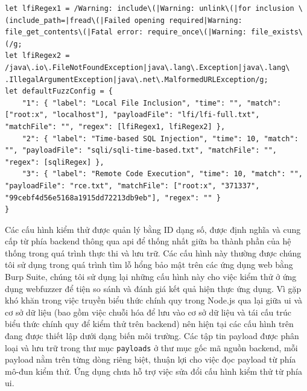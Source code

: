 \begin{lstlisting}[style=ES6, label={lst:default-fuzz-config}, caption={Cấu hình kiểm thử mặc định}]
let lfiRegex1 = /Warning: include\(|Warning: unlink\(|for inclusion \(include_path=|fread\(|Failed opening required|Warning: file_get_contents\(|Fatal error: require_once\(|Warning: file_exists\(/g;
let lfiRegex2 = /java\.io\.FileNotFoundException|java\.lang\.Exception|java\.lang\ .IllegalArgumentException|java\.net\.MalformedURLException/g;
let defaultFuzzConfig = {
    "1": { "label": "Local File Inclusion", "time": "", "match": ["root:x", "localhost"], "payloadFile": "lfi/lfi-full.txt", "matchFile": "", "regex": [lfiRegex1, lfiRegex2] },
    "2": { "label": "Time-based SQL Injection", "time": 10, "match": "", "payloadFile": "sqli/sqli-time-based.txt", "matchFile": "", "regex": [sqliRegex] },
    "3": { "label": "Remote Code Execution", "time": 10, "match": "", "payloadFile": "rce.txt", "matchFile": ["root:x", "371337", "99cebf4d56e5168a1915dd72213db9eb"], "regex": "" }
}
\end{lstlisting}
Các cấu hình kiểm thử được quản lý bằng ID dạng số, được định nghĩa và cung cấp từ phía backend thông qua \acrshort{api} để thống nhất giữa ba thành phần của hệ thống trong quá trình thực thi và lưu trữ. Các cấu hình này thường được chúng tôi sử dụng trong quá trình tìm lỗ hổng bảo mật trên các ứng dụng web bằng Burp Suite, chúng tôi sử dụng lại những cấu hình này cho việc kiểm thử ở ứng dụng webfuzzer để tiện so sánh và đánh giá kết quả hiện thực ứng dụng. Vì gặp khó khăn trong việc truyền biểu thức chính quy trong Node.js qua lại giữa \acrshort{ui} và cơ sở dữ liệu (bao gồm việc chuỗi hóa để lưu vào cơ sở dữ liệu và tái cấu trúc biểu thức chính quy để kiểm thử trên backend) nên hiện tại các cấu hình trên đang được thiết lập dưới dạng biến môi trường. Các tập tin payload được phân loại và lưu trữ trong thư mục \texttt{payloads} ở thư mục gốc mã nguồn backend, mỗi payload nằm trên từng dòng riêng biệt, thuận lợi cho việc đọc payload từ phía mô-đun kiểm thử. Ứng dụng chưa hỗ trợ việc sửa đổi cấu hình kiểm thử từ phía \acrshort{ui}.
